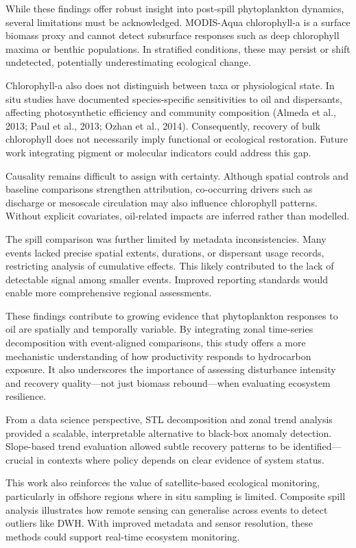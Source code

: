 \documentclass[
  11pt,
]{article}
\begin{document}
While these findings offer robust insight into post-spill phytoplankton
dynamics, several limitations must be acknowledged. MODIS-Aqua
chlorophyll-a is a surface biomass proxy and cannot detect subsurface
responses such as deep chlorophyll maxima or benthic populations. In
stratified conditions, these may persist or shift undetected,
potentially underestimating ecological change.

Chlorophyll-a also does not distinguish between taxa or physiological
state. In situ studies have documented species-specific sensitivities to
oil and dispersants, affecting photosynthetic efficiency and community
composition (Almeda et al., 2013; Paul et al., 2013; Ozhan et al.,
2014). Consequently, recovery of bulk chlorophyll does not necessarily
imply functional or ecological restoration. Future work integrating
pigment or molecular indicators could address this gap.

Causality remains difficult to assign with certainty. Although spatial
controls and baseline comparisons strengthen attribution, co-occurring
drivers such as discharge or mesoscale circulation may also influence
chlorophyll patterns. Without explicit covariates, oil-related impacts
are inferred rather than modelled.

The spill comparison was further limited by metadata inconsistencies.
Many events lacked precise spatial extents, durations, or dispersant
usage records, restricting analysis of cumulative effects. This likely
contributed to the lack of detectable signal among smaller events.
Improved reporting standards would enable more comprehensive regional
assessments.

These findings contribute to growing evidence that phytoplankton
responses to oil are spatially and temporally variable. By integrating
zonal time-series decomposition with event-aligned comparisons, this
study offers a more mechanistic understanding of how productivity
responds to hydrocarbon exposure. It also underscores the importance of
assessing disturbance intensity and recovery quality---not just biomass
rebound---when evaluating ecosystem resilience.

From a data science perspective, STL decomposition and zonal trend
analysis provided a scalable, interpretable alternative to black-box
anomaly detection. Slope-based trend evaluation allowed subtle recovery
patterns to be identified---crucial in contexts where policy depends on
clear evidence of system status.

This work also reinforces the value of satellite-based ecological
monitoring, particularly in offshore regions where in situ sampling is
limited. Composite spill analysis illustrates how remote sensing can
generalise across events to detect outliers like DWH. With improved
metadata and sensor resolution, these methods could support real-time
ecosystem monitoring.
\end{document}
